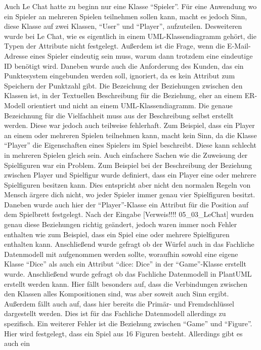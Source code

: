 Auch Le Chat hatte zu beginn nur eine Klasse ``Spieler''. Für eine Anwendung wo ein Spieler an mehreren Spielen teilnehmen sollen kann, macht es jedoch Sinn, diese 
Klasse auf zwei Klassen, ``User'' und ``Player'', aufzuteilen. Desweiteren wurde bei Le Chat, wie es eigentlich in einem UML-Klassendiagramm gehört, die Typen der
Attribute nicht festgelegt. Außerdem ist die Frage, wenn die E-Mail-Adresse eines Spieler eindeutig sein muss, warum dann trotzdem eine eindeutige ID benötigt wird.
Daneben wurde auch die Anforderung des Kunden, das ein Punktesystem eingebunden werden soll, ignoriert, da es kein Attribut zum Speichern der Punktzahl gibt.
Die Bezeichung der Beziehungen zwischen den Klassen ist, in der Textuellen Beschreibung für die Beziehung, eher an einem ER-Modell orientiert und nicht an einem 
UML-Klassendiagramm. Die genaue Bezeichnung für die Vielfachheit muss aus der Beschreibung selbst erstellt werden. Diese war jedoch auch teilweise fehlerhaft. Zum 
Beispiel, dass ein Player an einem oder mehreren Spielen teilnehmen kann, macht kein Sinn, da die Klasse ``Player'' die Eigenschaften eines Spielers
im Spiel beschreibt. Diese kann schlecht in mehreren Spielen gleich sein. Auch einfachere Sachen wie die Zuweisung der Spielfiguren war ein Problem. Zum Beispiel bei 
der Beschreibung der Beziehung zwischen Player und Spielfigur wurde definiert, dass ein Player eine oder mehrere Spielfiguren besitzen kann. Dies entspricht aber nicht 
den normalen Regeln von Mensch ärgere dich nicht, wo jeder Spieler immer genau vier Spielfiguren besitzt. Daneben wurde auch hier der ``Player''-Klasse ein Attribut
für die Position auf dem Spielbrett festgelegt. Nach der Eingabe [Verweis!!!! 05\_03\_LeChat] wurden genau diese Beziehungen richtig geändert, jedoch waren immer noch Fehler enthalten
wie zum Beispiel, dass ein Spiel eine oder mehrere Spielfiguren enthalten kann. Anschließend wurde gefragt ob der Würfel auch in das Fachliche Datenmodell mit aufgenommen
werden sollte, woraufhin sowohl eine eigene Klasse ``Dice'' als auch ein Attribut ``dice: Dice'' in der ``Game''-Klasse erstellt wurde. Anschließend wurde gefragt ob 
das Fachliche Datenmodell in PlantUML erstellt werden kann. Hier fällt besonders auf, dass die Verbindungen zwischen den Klassen alles Kompositionen sind, was aber soweit
auch Sinn ergibt. Außerdem fällt auch auf, dass hier bereits die Primär- und Fremdschlüssel dargestellt werden. Dies ist für das Fachliche Datenmodell allerdings zu spezifisch.
Ein weiterer Fehler ist die Beziehung zwischen ``Game'' und ``Figure''. Hier wird festgelegt, dass ein Spiel aus 16 Figuren besteht. Allerdings gibt es auch ein 
